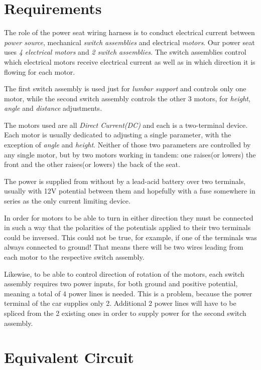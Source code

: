 \documentclass[12pt,letterpaper]{article}
\begin{document}
\section{Requirements}
The role of the power seat wiring harness is to conduct electrical current between \textit{power source}, mechanical \textit{switch assemblies} and electrical \textit{motors}. Our power seat uses \textit{4 electrical motors} and \textit{2 switch assemblies}. The switch assemblies control which electrical motors receive electrical current as well as in which direction it is flowing for each motor.

The first switch assembly is used just for \textit{lumbar support} and controls only one motor, while the second switch assembly controls the other 3 motors, for \textit{height}, \textit{angle} and \textit{distance} adjustments.

The motors used are all \textit{Direct Current(DC)} and each is a two-terminal device. Each motor is usually dedicated to adjusting a single parameter, with the exception of \textit{angle} and \textit{height}. Neither of those two parameters are controlled by any single motor, but by two motors working in tandem: one raises(or lowers) the front and the other raises(or lowers) the back of the seat.

The power is supplied from without by a lead-acid battery over two terminals, usually with 12\si{\volt} potential between them and hopefully with a fuse somewhere in series as the only current limiting device. 

In order for motors to be able to turn in either direction they must be connected in such a way that the polarities of the potentials applied to their two terminals could be inversed. This could not be true, for example, if one of the terminals was always connected to ground! That means there will be two wires leading from each motor to the respective switch assembly.

Likewise, to be able to control direction of rotation of the motors, each switch assembly requires two power inputs, for both ground and positive potential, meaning a total of 4 power lines is needed. This is a problem, because the power terminal of the car supplies only 2. Additional 2 power lines will have to be spliced from the 2 existing ones in order to supply power for the second switch assembly.

\newpage
{}
\section{Equivalent Circuit}
\end{document}
